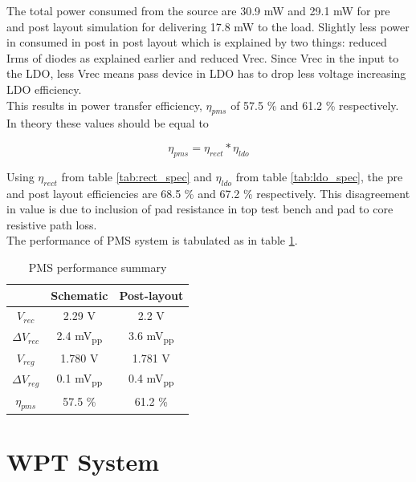 \documentclass[UKenglish]{ifimaster}  %
\begin{document}
The total power consumed from the source are 30.9 mW and 29.1 mW for pre and post layout simulation for delivering 17.8 mW to 
the load. Slightly less power in consumed in post in post layout which  is explained by two things: reduced Irms of 
diodes as explained earlier and reduced Vrec. Since Vrec in the input to the LDO, less Vrec means pass device in LDO has 
to drop less voltage increasing LDO efficiency. \\

This results in power transfer efficiency, $\eta_{pms}$ of 57.5  \% and 61.2  \% respectively. In 
theory these values should be equal to 

\begin{equation} \label{eq:wpt_effi} 
\eta_{pms} = \eta_{rect}*\eta_{ldo}
\end{equation}

Using $\eta_{rect}$ from table \ref{tab:rect_spec} and $\eta_{ldo}$ from table \ref{tab:ldo_spec}, the pre and post layout efficiencies are 68.5  \% and 67.2  \% respectively. This disagreement in value is due to inclusion of pad resistance in top test bench and pad to  core resistive path loss. \\

The performance of PMS system is tabulated as in table \ref{tab:pms_spec}.
\begin{table}[H]
\caption{PMS performance summary} 
\begin{center}
\begin{tabular}{c|c|c}
\hline \hline
			& \textbf{Schematic}	& \textbf{Post-layout} 	\\
\hline \hline
$V_{rec}$ 			& 2.29 \si{\volt}		& 2.2 V	\\ \hline
$\Delta V_{rec}$	& 2.4 \si{\milli\volt}\textsubscript{pp} & 3.6 \si{\milli\volt}\textsubscript{pp}		\\ \hline
$V_{reg}$			& 1.780	\si{\volt}		& 1.781 \si{\volt}			\\ \hline
$\Delta V_{reg}$ 	& 0.1 \si{\milli\volt}\textsubscript{pp} & 0.4 \si{\milli\volt}\textsubscript{pp}		\\ \hline
$\eta_{pms}$		& 	57.5  \%	& 61.2  \%		\\ 
 
\hline \hline
\end{tabular}
\end{center}
\label{tab:pms_spec}
\end{table}%

\chapter{WPT System} 
\end{document}
